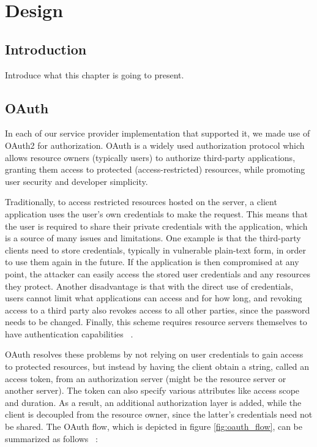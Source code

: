 \chapter{Design}

\section{Introduction}
Introduce what this chapter is going to present.

\section{OAuth}
In each of our service provider implementation that supported it, we made use of OAuth2 for authorization.  OAuth is a widely used authorization protocol which allows resource owners (typically users) to authorize third-party applications, granting them access to protected (access-restricted) resources, while promoting user security and developer simplicity.  

Traditionally, to access restricted resources hosted on the server, a client application uses the user's own credentials  to make the request. This means that the user is required to share their private credentials with the application, which is a source of many issues and limitations. One example is that the third-party clients need to store credentials, typically in vulnerable plain-text form,  in order to use them again in the future. If the application is then compromised at any point, the attacker can easily access the stored user credentials and any resources they protect. Another disadvantage is that with the direct use of credentials, users cannot limit what applications can access and for how long, and revoking access to a third party also revokes access to all other parties, since the password needs to be changed. Finally, this scheme requires resource servers themselves to have authentication capabilities ~\cite{oauth}.

OAuth resolves these problems by not relying on user credentials to gain access to protected resources, but instead by having the client obtain a string, called an access token, from an authorization server (might be the resource server or another server).  The token can also specify various attributes like access scope and duration. As a result, an additional authorization layer is added, while the client is decoupled from the resource owner, since the latter's credentials need not be shared. The OAuth flow, which is depicted in figure \ref{fig:oauth_flow}, can be summarized as follows ~\cite{oauth}:

